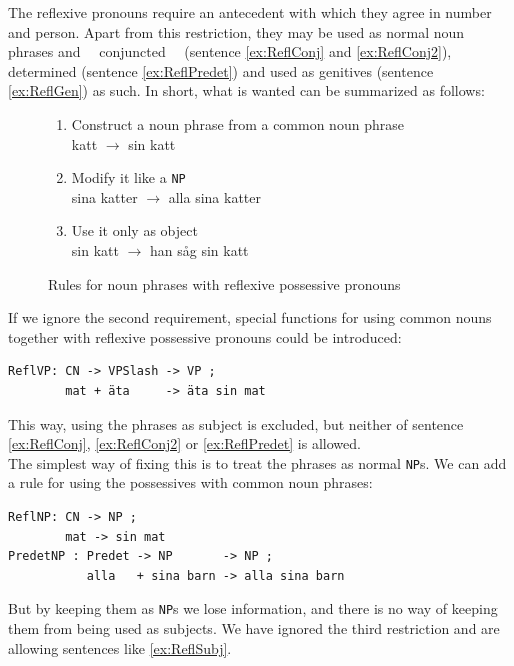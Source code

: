 \documentclass{report}
\begin{document}
The reflexive pronouns require an antecedent with which they agree in
number and person. Apart from this restriction, they may be used as normal
noun phrases and ~~conjuncted~~ (sentence \ref{ex:ReflConj} and \ref{ex:ReflConj2}),
determined (sentence \ref{ex:ReflPredet}) and used as genitives (sentence
\ref{ex:ReflGen}) as such.
In short, what is wanted can be summarized as follows:
\begin{figure}
\begin{enumerate}
\item{
Construct a noun phrase from a common noun phrase \\
katt $\rightarrow$ sin katt} %
\item{Modify it like a \verb|NP|\\
sina katter $\rightarrow$ alla sina katter}
\item{Use it only as object\\
sin katt $\rightarrow$ han såg sin katt }
\end{enumerate}
\caption{Rules for noun phrases with reflexive possessive pronouns}
\label{fig:reflrestrict}
\end{figure}
If we ignore the second requirement, special functions for using common nouns
together with reflexive possessive pronouns could be introduced:
\begin{verbatim}
ReflVP: CN -> VPSlash -> VP ;
        mat + äta     -> äta sin mat 
\end{verbatim}
This way, using the phrases as subject is excluded, but neither of sentence
\ref{ex:ReflConj}, \ref{ex:ReflConj2} or \ref{ex:ReflPredet} is allowed.\\
The simplest way of fixing this is to treat the phrases as normal \verb_NP_s.
We can add a rule for using the possessives with common noun phrases:
\begin{verbatim}
ReflNP: CN -> NP ;
        mat -> sin mat 
PredetNP : Predet -> NP       -> NP ;
           alla   + sina barn -> alla sina barn
\end{verbatim}
But by keeping them as \verb_NP_s we lose information, and there is no way of
keeping them from being used as subjects. We have ignored the third restriction
and are allowing sentences like \ref{ex:ReflSubj}.
\end{document}

